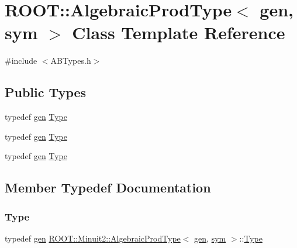 \hypertarget{classROOT_1_1Minuit2_1_1AlgebraicProdType_3_01gen_00_01sym_01_4}{}\section{R\+O\+OT\+:\+:Algebraic\+Prod\+Type$<$ gen, sym $>$ Class Template Reference}
\label{classROOT_1_1Minuit2_1_1AlgebraicProdType_3_01gen_00_01sym_01_4}


{\ttfamily \#include $<$A\+B\+Types.\+h$>$}

\subsection*{Public Types}
\begin{DoxyCompactItemize}
\item 
typedef \mbox{\hyperlink{classROOT_1_1Minuit2_1_1gen}{gen}} \mbox{\hyperlink{classROOT_1_1Minuit2_1_1AlgebraicProdType_3_01gen_00_01sym_01_4_acdbf9062d11987f3a1cb857a95ef2669}{Type}}
\item 
typedef \mbox{\hyperlink{classROOT_1_1Minuit2_1_1gen}{gen}} \mbox{\hyperlink{classROOT_1_1Minuit2_1_1AlgebraicProdType_3_01gen_00_01sym_01_4_acdbf9062d11987f3a1cb857a95ef2669}{Type}}
\item 
typedef \mbox{\hyperlink{classROOT_1_1Minuit2_1_1gen}{gen}} \mbox{\hyperlink{classROOT_1_1Minuit2_1_1AlgebraicProdType_3_01gen_00_01sym_01_4_acdbf9062d11987f3a1cb857a95ef2669}{Type}}
\end{DoxyCompactItemize}


\subsection{Member Typedef Documentation}
\mbox{\label{classROOT_1_1Minuit2_1_1AlgebraicProdType_3_01gen_00_01sym_01_4_acdbf9062d11987f3a1cb857a95ef2669}} 
\subsubsection{\texorpdfstring{Type}{Type}\hspace{0.1cm}{\footnotesize\ttfamily [1/3]}}
{\footnotesize\ttfamily typedef \mbox{\hyperlink{classROOT_1_1Minuit2_1_1gen}{gen}} \mbox{\hyperlink{classROOT_1_1Minuit2_1_1AlgebraicProdType}{R\+O\+O\+T\+::\+Minuit2\+::\+Algebraic\+Prod\+Type}}$<$ \mbox{\hyperlink{classROOT_1_1Minuit2_1_1gen}{gen}}, \mbox{\hyperlink{classROOT_1_1Minuit2_1_1sym}{sym}} $>$\+::\mbox{\hyperlink{classROOT_1_1Minuit2_1_1AlgebraicProdType_3_01gen_00_01sym_01_4_acdbf9062d11987f3a1cb857a95ef2669}{Type}}}

